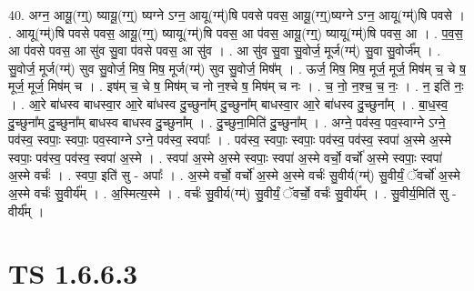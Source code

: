 \documentclass[17pt]{extarticle}
\begin{document}
40. अग्न॒ आयू॒(ग्ग्॒) ष्यायू॒(ग्ग्॒) ष्यग्ने ऽग्न॒ आयू(ग्म्॑)षि पवसे पवस॒ आयू॒(ग्ग्॒)ष्यग्ने ऽग्न॒ आयू(ग्म्॑)षि पवसे । . आयू(ग्म्॑)षि पवसे पवस॒ आयू॒(ग्ग्॒) ष्यायू(ग्म्॑)षि पवस॒ आ प॑वस॒ आयू॒(ग्ग्॒) ष्यायू(ग्म्॑)षि पवस॒ आ । . प॒व॒स॒ आ प॑वसे पवस॒ आ सु॑व सु॒वा प॑वसे पवस॒ आ सु॑व । . आ सु॑व सु॒वा सु॒वोर्ज॒ मूर्ज(ग्म्॑) सु॒वा सु॒वोर्ज᳚म् । . सु॒वोर्ज॒ मूर्ज(ग्म्॑) सुव सु॒वोर्ज॒ मिष॒ मिष॒ मूर्ज(ग्म्॑) सुव सु॒वोर्ज॒ मिष᳚म् । . ऊर्ज॒ मिष॒ मिष॒ मूर्ज॒ मूर्ज॒ मिष॑म् च॒ चे ष॒ मूर्ज॒ मूर्ज॒ मिष॑म् च । . इष॑म् च॒ चे ष॒ मिष॑म् च नो न॒श्चे ष॒ मिष॑म् च नः । . च॒ नो॒ न॒श्च॒ च॒ नः॒ । . न॒ इति॑ नः॒ । . आ॒रे बा॑धस्व बाधस्वा॒र आ॒रे बा॑धस्व दु॒च्छुना᳚म् दु॒च्छुना᳚म् बाधस्वा॒र आ॒रे बा॑धस्व दु॒च्छुना᳚म् । . बा॒ध॒स्व॒ दु॒च्छुना᳚म् दु॒च्छुना᳚म् बाधस्व बाधस्व दु॒च्छुना᳚म् । . दु॒च्छुना॒मिति॑ दु॒च्छुना᳚म् । . अग्ने॒ पव॑स्व॒ पव॒स्वाग्ने ऽग्ने॒ पव॑स्व॒ स्वपाः॒ स्वपाः॒ पव॒स्वाग्ने ऽग्ने॒ पव॑स्व॒ स्वपाः᳚ । . पव॑स्व॒ स्वपाः॒ स्वपाः॒ पव॑स्व॒ पव॑स्व॒ स्वपा॑ अ॒स्मे अ॒स्मे स्वपाः॒ पव॑स्व॒ पव॑स्व॒ स्वपा॑ अ॒स्मे । . स्वपा॑ अ॒स्मे अ॒स्मे स्वपाः॒ स्वपा॑ अ॒स्मे वर्चो॒ वर्चो॑ अ॒स्मे स्वपाः॒ स्वपा॑ अ॒स्मे वर्चः॑ । . स्वपा॒ इति॑ सु - अपाः᳚ । . अ॒स्मे वर्चो॒ वर्चो॑ अ॒स्मे अ॒स्मे वर्चः॑ सु॒वीर्य(ग्म्॑) सु॒वीर्यं॒ ॅवर्चो॑ अ॒स्मे अ॒स्मे वर्चः॑ सु॒वीर्य᳚म् । . अ॒स्मित्य॒स्मे । . वर्चः॑ सु॒वीर्य(ग्म्॑) सु॒वीर्यं॒ ॅवर्चो॒ वर्चः॑ सु॒वीर्य᳚म् । . सु॒वीर्य॒मिति॑ सु - वीर्य᳚म् । \newline
\pagebreak
{}

\section{ TS 1.6.6.3 }
\end{document}

